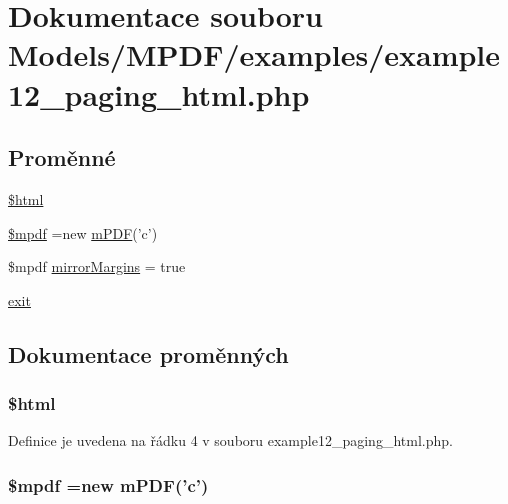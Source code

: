 \hypertarget{example12__paging__html_8php}{\section{Dokumentace souboru Models/\-M\-P\-D\-F/examples/example12\-\_\-paging\-\_\-html.php}
\label{example12__paging__html_8php}
}
\subsection*{Proměnné}
\begin{DoxyCompactItemize}
\item 
\hyperlink{example12__paging__html_8php_a6f96e7fc92441776c9d1cd3386663b40}{\$html}
\item 
\hyperlink{example12__paging__html_8php_ad028f81910d6cbab9b184d2214b3a8f8}{\$mpdf} =new \hyperlink{classm_p_d_f}{m\-P\-D\-F}('c')
\item 
\$mpdf \hyperlink{example12__paging__html_8php_a24c284cb7774410f65953584ea1fd9c1}{mirror\-Margins} = true
\item 
\hyperlink{example12__paging__html_8php_a6733eb5f605d09eaede9845835d71c4e}{exit}
\end{DoxyCompactItemize}


\subsection{Dokumentace proměnných}
\hypertarget{example12__paging__html_8php_a6f96e7fc92441776c9d1cd3386663b40}{
\subsubsection[{\$html}]{\setlength{\rightskip}{0pt plus 5cm}\$html}}\label{example12__paging__html_8php_a6f96e7fc92441776c9d1cd3386663b40}


Definice je uvedena na řádku 4 v souboru example12\-\_\-paging\-\_\-html.\-php.

\hypertarget{example12__paging__html_8php_ad028f81910d6cbab9b184d2214b3a8f8}{
\subsubsection[{\$mpdf}]{\setlength{\rightskip}{0pt plus 5cm}\$mpdf =new {\bf m\-P\-D\-F}('c')}}\label{example12__paging__html_8php_ad028f81910d6cbab9b184d2214b3a8f8}


